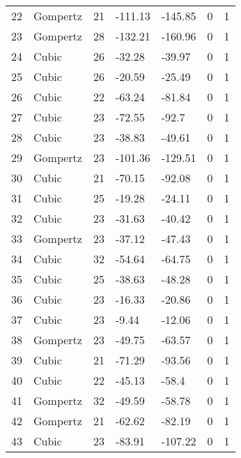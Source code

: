 \documentclass[11pt]{article}
\begin{document}
\begin{center}
\begin{longtable}{lllllll}
        22  & Gompertz  & 21              & -111.13 & -145.85 & 0       & 1    \\
        23  & Gompertz  & 28              & -132.21 & -160.96 & 0       & 1    \\
        24  & Cubic     & 26              & -32.28  & -39.97  & 0       & 1    \\
        25  & Cubic     & 26              & -20.59  & -25.49  & 0       & 1    \\
        26  & Cubic     & 22              & -63.24  & -81.84  & 0       & 1    \\
        27  & Cubic     & 23              & -72.55  & -92.7   & 0       & 1    \\
        28  & Cubic     & 23              & -38.83  & -49.61  & 0       & 1    \\
        29  & Gompertz  & 23              & -101.36 & -129.51 & 0       & 1    \\
        30  & Cubic     & 21              & -70.15  & -92.08  & 0       & 1    \\
        31  & Cubic     & 25              & -19.28  & -24.11  & 0       & 1    \\
        32  & Cubic     & 23              & -31.63  & -40.42  & 0       & 1    \\
        33  & Gompertz  & 23              & -37.12  & -47.43  & 0       & 1    \\
        34  & Cubic     & 32              & -54.64  & -64.75  & 0       & 1    \\
        35  & Cubic     & 25              & -38.63  & -48.28  & 0       & 1    \\
        36  & Cubic     & 23              & -16.33  & -20.86  & 0       & 1    \\
        37  & Cubic     & 23              & -9.44   & -12.06  & 0       & 1    \\
        38  & Gompertz  & 23              & -49.75  & -63.57  & 0       & 1    \\
        39  & Cubic     & 21              & -71.29  & -93.56  & 0       & 1    \\
        40  & Cubic     & 22              & -45.13  & -58.4   & 0       & 1    \\
        41  & Gompertz  & 32              & -49.59  & -58.78  & 0       & 1    \\
        42  & Gompertz  & 21              & -62.62  & -82.19  & 0       & 1    \\
        43  & Cubic     & 23              & -83.91  & -107.22 & 0       & 1    \\

\end{longtable}
\end{center}
\end{document}
